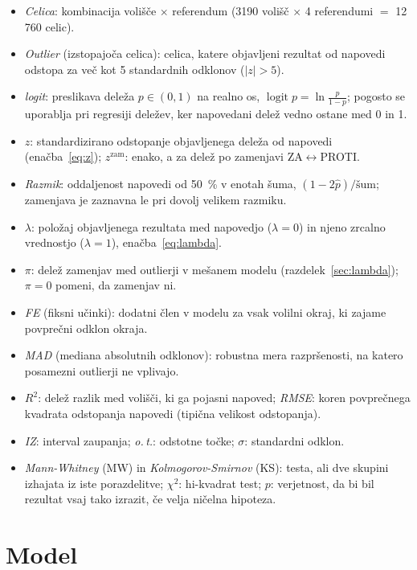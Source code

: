 \documentclass[11pt,a4paper]{article}
\begin{document}
\begin{itemize}\setlength{\itemsep}{0pt}
\item \emph{Celica}: kombinacija volišče $\times$ referendum (3190 volišč $\times$ 4 referendumi $=$ 12\,760 celic).
\item \emph{Outlier} (izstopajoča celica): celica, katere objavljeni rezultat od napovedi odstopa za več kot 5 standardnih odklonov ($|z|>5$).
\item \emph{logit}: preslikava deleža $p\in(0,1)$ na realno os, $\operatorname{logit}p=\ln\frac{p}{1-p}$; pogosto se uporablja pri regresiji deležev, ker napovedani delež vedno ostane med 0 in 1.
\item $z$: standardizirano odstopanje objavljenega deleža od napovedi (enačba~\ref{eq:z}); $z^{\text{zam}}$: enako, a za delež po zamenjavi ZA$\leftrightarrow$PROTI.
\item \emph{Razmik}: oddaljenost napovedi od 50~\% v enotah šuma, $(1-2\hat p)/\text{šum}$; zamenjava je zaznavna le pri dovolj velikem razmiku.
\item $\lambda$: položaj objavljenega rezultata med napovedjo ($\lambda=0$) in njeno zrcalno vrednostjo ($\lambda=1$), enačba~\ref{eq:lambda}.
\item $\pi$: delež zamenjav med outlierji v mešanem modelu (razdelek~\ref{sec:lambda}); $\pi=0$ pomeni, da zamenjav ni.
\item \emph{FE} (fiksni učinki): dodatni člen v modelu za vsak volilni okraj, ki zajame povprečni odklon okraja.
\item \emph{MAD} (mediana absolutnih odklonov): robustna mera razpršenosti, na katero posamezni outlierji ne vplivajo.
\item $R^2$: delež razlik med volišči, ki ga pojasni napoved; \emph{RMSE}: koren povprečnega kvadrata odstopanja napovedi (tipična velikost odstopanja).
\item \emph{IZ}: interval zaupanja; \emph{o.\,t.}: odstotne točke; $\sigma$: standardni odklon.
\item \emph{Mann-Whitney} (MW) in \emph{Kolmogorov-Smirnov} (KS): testa, ali dve skupini izhajata iz iste porazdelitve; $\chi^2$: hi-kvadrat test; $p$: verjetnost, da bi bil rezultat vsaj tako izrazit, če velja ničelna hipoteza.
\end{itemize}

\section{Model}
\end{document}
